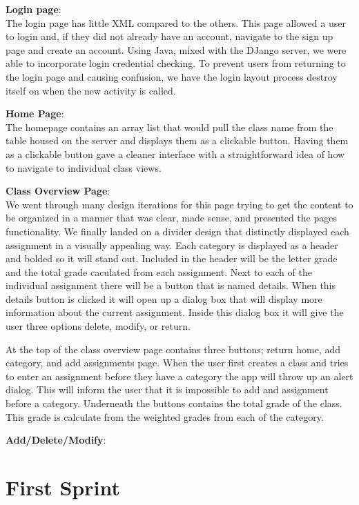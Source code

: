 \documentclass[a4paper]{article} %
\begin{document}
\textbf{Login page}:\\
The login page has little XML compared to the others. This page allowed a user to login and, if they did not already have an account, navigate to the sign up page and create an account. Using Java, mixed with the DJango server, we were able to incorporate login credential checking. To prevent users from returning to the login page and causing confusion, we have the login layout process destroy itself on when the new activity is called. 

\textbf{Home Page}:\\ 
The homepage contains an array list that would pull the class name from the table housed on the server and displays them as a clickable button. Having them as a clickable button gave a cleaner interface with a straightforward idea of how to navigate to individual class views. 

\textbf{Class Overview Page}:\\
We went through many design iterations for this page trying to get the content to be organized in a manner that was clear, made sense, and presented the pages functionality. We finally landed on a divider design that distinctly displayed each assignment in a visually appealing way. Each category is displayed as a header and bolded so it will stand out. Included in the header will be the letter grade and the total grade caculated from each assignment. Next to each of the individual assignment there will be a button that is named details. When this details button is clicked it will open up a dialog box that will display more information about the current assignment. Inside this dialog box it will give the user three options delete, modify, or return.

At the top of the class overview page contains three buttons; return home, add category, and add assignments page. When the user first creates a class and tries to enter an assignment before they have a category the app will throw up an alert dialog. This will inform the user that it is impossible to add and assignment before a category. Underneath the buttons contains the total grade of the class. This grade is calculate from the weighted grades from each of the category.


\textbf{Add/Delete/Modify}:\\


\section{First Sprint}
\end{document}
